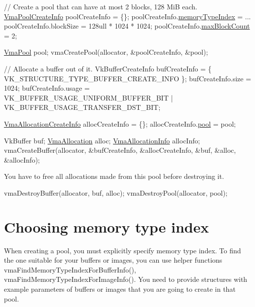 \begin{DoxyCode}
\textcolor{comment}{// Create a pool that can have at most 2 blocks, 128 MiB each.}
\hyperlink{structVmaPoolCreateInfo}{VmaPoolCreateInfo} poolCreateInfo = \{\};
poolCreateInfo.\hyperlink{structVmaPoolCreateInfo_a596fa76b685d3f1f688f84a709a5b319}{memoryTypeIndex} = ...
poolCreateInfo.blockSize = 128ull * 1024 * 1024;
poolCreateInfo.\hyperlink{structVmaPoolCreateInfo_ae41142f2834fcdc82baa4883c187b75c}{maxBlockCount} = 2;

\hyperlink{structVmaPool}{VmaPool} pool;
vmaCreatePool(allocator, &poolCreateInfo, &pool);

\textcolor{comment}{// Allocate a buffer out of it.}
VkBufferCreateInfo bufCreateInfo = \{ VK\_STRUCTURE\_TYPE\_BUFFER\_CREATE\_INFO \};
bufCreateInfo.size = 1024;
bufCreateInfo.usage = VK\_BUFFER\_USAGE\_UNIFORM\_BUFFER\_BIT | VK\_BUFFER\_USAGE\_TRANSFER\_DST\_BIT;

\hyperlink{structVmaAllocationCreateInfo}{VmaAllocationCreateInfo} allocCreateInfo = \{\};
allocCreateInfo.\hyperlink{structVmaAllocationCreateInfo_a6272c0555cfd1fe28bff1afeb6190150}{pool} = pool;

VkBuffer buf;
\hyperlink{structVmaAllocation}{VmaAllocation} alloc;
\hyperlink{structVmaAllocationInfo}{VmaAllocationInfo} allocInfo;
vmaCreateBuffer(allocator, &bufCreateInfo, &allocCreateInfo, &buf, &alloc, &allocInfo);
\end{DoxyCode}


You have to free all allocations made from this pool before destroying it.


\begin{DoxyCode}
vmaDestroyBuffer(allocator, buf, alloc);
vmaDestroyPool(allocator, pool);
\end{DoxyCode}
\hypertarget{custom_memory_pools_custom_memory_pools_MemTypeIndex}{}\section{Choosing memory type index}\label{custom_memory_pools_custom_memory_pools_MemTypeIndex}
When creating a pool, you must explicitly specify memory type index. To find the one suitable for your buffers or images, you can use helper functions vma\+Find\+Memory\+Type\+Index\+For\+Buffer\+Info(), vma\+Find\+Memory\+Type\+Index\+For\+Image\+Info(). You need to provide structures with example parameters of buffers or images that you are going to create in that pool.


